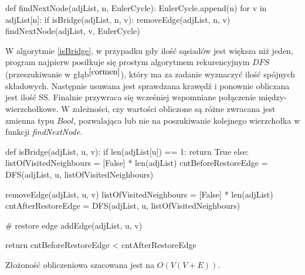 \documentclass[a4paper, 12pt, twoside, openright]{article}
\begin{document}
\begin{algorithm}[caption={\textit{findNextNode} rekurencyjna funkcja pomocnicza dla \textit{FleuryAlgorithm} }, label={findNextNode}]
def findNextNode(adjList, n, EulerCycle):
	EulerCycle.append(n)
	for v in adjList[n]:
		if isBridge(adjList, n, v):
			removeEdge(adjList, n, v)
			findNextNode(adjList, v, EulerCycle)
\end{algorithm}
	
	W algorytmie \ref{isBridge}, w przypadku gdy ilość sąsiadów jest większa niż jeden, program najpierw posiłkuje się prostym algorytmem rekurencyjnym $DFS$ (przeszukiwanie w głąb$^{\cite{cormen}}$), który ma za zadanie wyznaczyć ilość spójnych składowych. Następnie usuwana jest sprawdzana krawędź i ponownie obliczana jest ilość SS. Finalnie przywraca się wcześniej wspomniane połączenie między-wierzchołkowe. W zależności, czy wartości obliczone są różne zwracana jest zmienna typu $Bool$, pozwalająca lub nie na poszukiwanie kolejnego wierzchołka w funkcji \textit{findNextNode}.
	
\begin{algorithm}[caption={\textit{isBridge} rekurencyjna funkcja pomocnicza dla \textit{FleuryAlgorithm} }, label={isBridge}]
def isBridge(adjList, u, v):
	if len(adjList[u]) == 1:
		return True
	else:
		listOfVisitedNeighbours = [False] * len(adjList)
		cntBeforeRestoreEdge = DFS(adjList, u, listOfVisitedNeighbours)
		
		removeEdge(adjList, u, v)
		listOfVisitedNeighbours = [False] * len(adjList)
		cntAfterRestoreEdge = DFS(adjList, u, listOfVisitedNeighbours)
		
		# restore edge
		addEdge(adjList, u, v)
		
		return cntBeforeRestoreEdge < cntAfterRestoreEdge

\end{algorithm}
	Złożoność obliczeniowa szacowana jest na $O(V(V+E))$.
	
\end{document}
